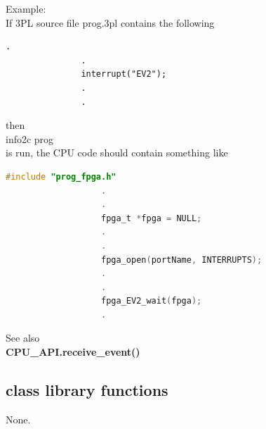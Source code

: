             Example: \\
            If 3PL source file prog.3pl contains the following \\
            \begin{lstlisting}[gobble=12, language=threepl]
               .
               .
               interrupt("EV2");
               .
               .
            \end{lstlisting}
            then \\
            info2c prog \\
            is run, the CPU code should contain something like \\
            \begin{lstlisting}[gobble=12, language=C]
                   #include "prog_fpga.h"
                   .
                   .
                   fpga_t *fpga = NULL;
                   .
                   .
                   fpga_open(portName, INTERRUPTS);
                   .
                   .
                   fpga_EV2_wait(fpga);
                   .
            \end{lstlisting}
            
            See also \\
            {\bf CPU\_API.receive\_event()}  \\




    \subsection{class library functions}
    
    None.

